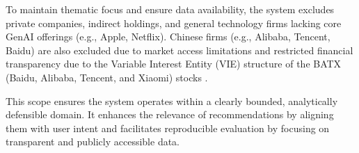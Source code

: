 To maintain thematic focus and ensure data availability, the system excludes private companies, indirect holdings, and general technology firms lacking core GenAI offerings (e.g., Apple, Netflix). Chinese firms (e.g., Alibaba, Tencent, Baidu) are also excluded due to market access limitations \citep{usdoc2022exportcontrols} and restricted financial transparency due to the Variable Interest Entity (VIE) structure of the BATX (Baidu, Alibaba, Tencent, and Xiaomi) stocks \citep{chen2021vie}.

This scope ensures the system operates within a clearly bounded, analytically defensible domain. It enhances the relevance of recommendations by aligning them with user intent and facilitates reproducible evaluation by focusing on transparent and publicly accessible data.